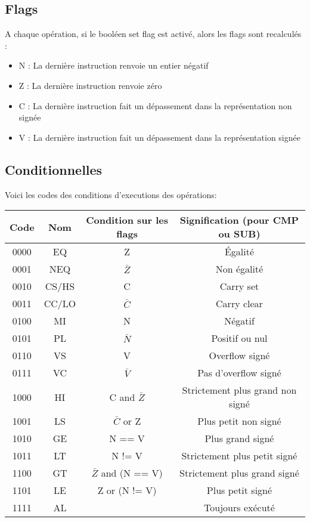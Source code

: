 \documentclass[a4paper]{article}
\begin{document}
\subsection{Flags}

A chaque opération, si le booléen set flag est activé, alors les flags sont
recalculés :
  \begin{itemize}
  \item N : La dernière instruction renvoie un entier négatif
  \item Z : La dernière instruction renvoie zéro
  \item C : La dernière instruction fait un dépassement dans la représentation
    non signée
  \item V : La dernière instruction fait un dépassement dans la représentation
    signée
  \end{itemize}

  \subsection{Conditionnelles}

  Voici les codes des conditions d'executions des opérations:\\

\begin{tabular}{|c|c|c|c|}
  \hline
  Code & Nom & Condition sur les flags & Signification (pour CMP ou SUB)\\
  \hline
  0000 & EQ & Z & Égalité\\
  0001 & NEQ & $\bar{Z}$ & Non égalité\\
  0010 & CS/HS & C & Carry set\\
  0011 & CC/LO & $\bar{C}$ & Carry clear\\
  0100 & MI & N & Négatif \\
  0101 & PL & $\bar{N}$ & Positif ou nul \\
  0110 & VS & V & Overflow signé \\
  0111 & VC & $\bar{V}$ & Pas d'overflow signé \\
  1000 & HI & C and $\bar{Z}$ & Strictement plus grand non signé \\
  1001 & LS & $\bar{C}$ or Z & Plus petit non signé \\
  1010 & GE & N == V & Plus grand signé \\
  1011 & LT & N != V & Strictement plus petit signé\\
  1100 & GT & $\bar{Z}$ and (N == V) & Strictement plus grand signé \\
  1101 & LE & Z or (N != V) & Plus petit signé \\
  1111 & AL &  & Toujours exécuté \\
  \hline
\end{tabular}
\end{document}
